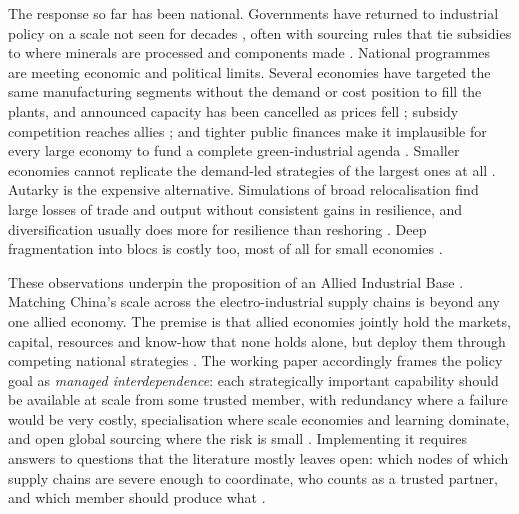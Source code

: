 The response so far has been national. Governments have returned to industrial policy on a scale
not seen for decades \citep{juhasz2024new, evenett2024return}, often with sourcing rules that tie
subsidies to where minerals are processed and components made \citep{bown2023industrial}. National
programmes are meeting economic and political limits. Several economies have targeted the same
manufacturing segments without the demand or cost position to fill the plants, and announced
capacity has been cancelled as prices fell \citep{iea2026etp}; subsidy competition reaches allies
\citep{clausing2023carbon}; and tighter public finances make it implausible for every large
economy to fund a complete green-industrial agenda \citep{ladislaw2025evolution}. Smaller
economies cannot replicate the demand-led strategies of the largest ones at all
\citep{albertone2025regional}. Autarky is the expensive alternative. Simulations of broad
relocalisation find large losses of trade and output without consistent gains in resilience, and
diversification usually does more for resilience than reshoring \citep{oecd2025supply,
thakurweigold2024promoting}. Deep fragmentation into blocs is costly too, most of all for small
economies \citep{aiyar2023geoeconomic, javorcik2024economic}.

These observations underpin the proposition of an Allied Industrial Base
\citep{campbell2025underestimating, neis2026allied}. Matching China's scale across the
electro-industrial supply chains is beyond any one allied economy. The premise is that allied
economies jointly hold the markets, capital, resources and know-how that none holds alone, but
deploy them through competing national strategies \citep{campbell2025underestimating,
neis2026allied}. The working paper accordingly frames the policy goal as \emph{managed
interdependence}: each strategically important capability should be available at scale from some
trusted member, with redundancy where a failure would be very costly, specialisation where scale
economies and learning dominate, and open global sourcing where the risk is small
\citep{neis2026allied}. Implementing it requires answers to questions
that the literature mostly leaves open: which nodes of
which supply chains are severe enough to coordinate, who counts as a trusted partner, and which
member should produce what \citep[Section 5]{neis2026allied}.

